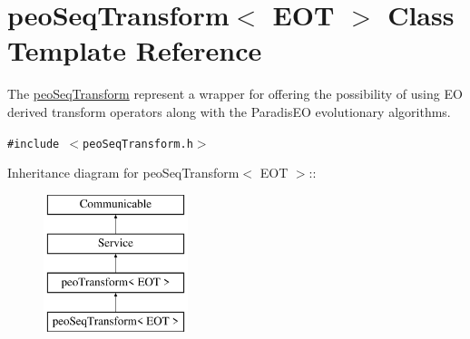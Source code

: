 \hypertarget{classpeoSeqTransform}{
\section{peo\-Seq\-Transform$<$ EOT $>$ Class Template Reference}
\label{classpeoSeqTransform}
}
The \hyperlink{classpeoSeqTransform}{peo\-Seq\-Transform} represent a wrapper for offering the possibility of using EO derived transform operators along with the Paradis\-EO evolutionary algorithms.  


{\tt \#include $<$peo\-Seq\-Transform.h$>$}

Inheritance diagram for peo\-Seq\-Transform$<$ EOT $>$::\begin{figure}[H]
\begin{center}
\leavevmode
\includegraphics[height=4cm]{classpeoSeqTransform}
\end{center}
\end{figure}
